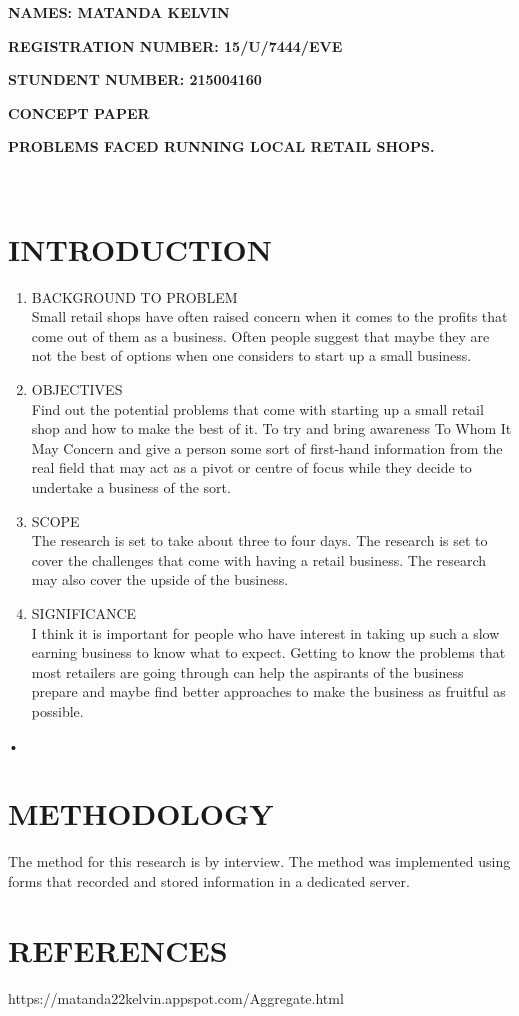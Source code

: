 \documentclass[11pt]{article}
\begin{document}
\textbf{NAMES: MATANDA KELVIN}


\textbf{REGISTRATION NUMBER: 15/U/7444/EVE}


\textbf{STUNDENT NUMBER: 215004160}


\textbf{CONCEPT PAPER}\\



\begin{large}\textbf{PROBLEMS FACED RUNNING LOCAL RETAIL SHOPS.}\end{large}\\

\section{INTRODUCTION}
\begin{enumerate}
\item BACKGROUND TO PROBLEM\\
Small retail shops have often raised concern when it comes to the profits that come out of them as a business.
 Often people suggest that maybe they are not the best of options when one considers to start up a small business.

\item OBJECTIVES\\
Find out the potential problems that come with starting up a small retail shop and how to make the best of it.
To try and bring awareness To Whom It May Concern and give a person some sort of first-hand information from the
 real field that may act as a pivot or centre of focus while they decide to undertake a business of the sort.


\item SCOPE\\
The research is set to take about three to four days.
The research is set to cover the challenges that come with having a retail business.
 The research may also cover the upside of the business. 

\item SIGNIFICANCE\\
I think it is important for people who have interest in taking up such a slow earning business to know what to expect.
Getting to know the problems that most retailers are going through can help the aspirants of the business prepare and
 maybe find better approaches to make the business as fruitful as possible. 


\end{enumerate}•

\section{METHODOLOGY}The method for this research is by interview. 
The method was implemented using forms that recorded and stored information in a dedicated server. 


\section{REFERENCES}
https://matanda22kelvin.appspot.com/Aggregate.html
\end{document}
